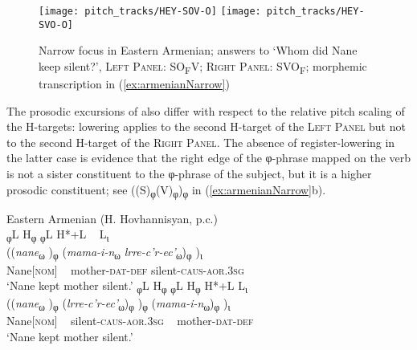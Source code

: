 \documentclass[output=paper,colorlinks,citecolor=brown]{langscibook}
\begin{document}
\begin{figure}
    \texttt{[image: pitch\_tracks/HEY-SOV-O]}
    \texttt{[image: pitch\_tracks/HEY-SVO-O]}
    \caption{Narrow focus in Eastern Armenian; answers to ‘Whom did Nane keep silent?’, \textsc{Left Panel}: SO\textsubscript{F}V; \textsc{Right Panel}: SVO\textsubscript{F}; morphemic transcription in (\ref{ex:armenianNarrow})}
    \label{fig:armenianNarrow}
\end{figure}

The prosodic excursions of  also differ with respect to the relative pitch scaling of the H-targets:  lowering applies to the second H-target of the \textsc{Left Panel} but not to the second H-target of the \textsc{Right Panel}. The absence of register-lowering in the latter case is evidence that the right edge of the φ-phrase mapped on the verb is not a sister constituent to the φ-phrase of the subject, but it is a higher prosodic constituent; see ((S)\textsubscript{φ}(V)\textsubscript{φ})\textsubscript{φ} in (\ref{ex:armenianNarrow}b).

\begin{samepage}
\ea \label{ex:armenianNarrow}
    Eastern Armenian (H. Hovhannisyan, p.c.)\\ 
    \ea 
        \glll \textup{\textsubscript{φ}L} \textup{H\textsubscript{φ}} {\textup{\textsubscript{φ}L} { } { }  \textup{H*+L}} ~ \textup{L\textsubscript{ι}} \\
            ((\textit{nane}\textsubscript{ω} )\textsubscript{φ} (\textit{mama-i-n}\textsubscript{ω} \textit{lrre-c’r-ec’}\textsubscript{ω})\textsubscript{φ} )\textsubscript{ι}\\
            Nane[\textsc{nom}] ~ mother-\textsc{dat-def}	silent-\textsc{caus-aor.3sg}\\
            \glt ‘Nane kept mother silent.’
    \ex 
        \glll \textup{\textsubscript{φ}L} \textup{H\textsubscript{φ}} \textup{\textsubscript{φ}L} \textup{H\textsubscript{φ}} \hspace{1cm}\textup{H*+L} \textup{L\textsubscript{ι}} \\
            ((\textit{nane}\textsubscript{ω} )\textsubscript{φ} (\textit{lrre-c’r-ec’}\textsubscript{ω})\textsubscript{φ} )\textsubscript{φ} (\textit{mama-i-n}\textsubscript{ω})\textsubscript{φ}  )\textsubscript{ι}\\
            Nane[\textsc{nom}] ~ silent-\textsc{caus-aor.3sg} ~ mother-\textsc{dat-def}\\
            \glt ‘Nane kept mother silent.’
    \z
\z
\end{samepage}
\end{document}
